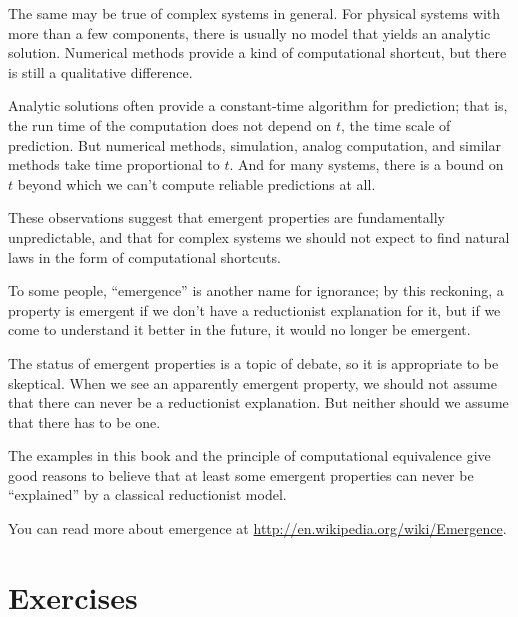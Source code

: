 \documentclass[12pt]{book}
\theoremstyle{exercise}
\begin{document}
The same may be true of complex systems in general.  For physical
systems with more than a few components, there is usually no model
that yields an analytic solution.  Numerical methods provide a kind of
computational shortcut, but there is still a qualitative difference.

Analytic solutions often provide a constant-time algorithm for
prediction; that is, the run time of the computation does not depend
on $t$, the time scale of prediction.  But numerical methods,
simulation, analog computation, and similar methods take time
proportional to $t$.  And for many systems, there is a bound on $t$
beyond which we can't compute reliable predictions at all.

These observations suggest that emergent properties are fundamentally
unpredictable, and that for complex systems we should not expect to
find natural laws in the form of computational shortcuts.

To some people, ``emergence'' is another name for ignorance; by this
reckoning, a property is emergent if we don't have a reductionist
explanation for it, but if we come to understand it better in the
future, it would no longer be emergent.

The status of emergent properties is a topic of debate, so it is
appropriate to be skeptical.  When we see an apparently emergent
property, we should not assume that there can never be a reductionist
explanation.  But neither should we assume that there has to be one.

The examples in this book and the principle of computational
equivalence give good reasons to believe that at least some emergent
properties can never be ``explained'' by a classical reductionist
model.

You can read more about emergence at
\url{http://en.wikipedia.org/wiki/Emergence}.


\section{Exercises}
\end{document}
